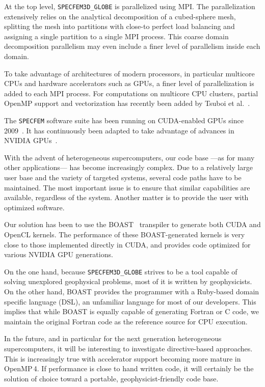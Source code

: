 At the top level, \texttt{SPECFEM3D\_GLOBE} is parallelized using MPI. The
parallelization extensively relies on the analytical decomposition of a
cubed-sphere mesh, splitting the mesh into partitions with close-to perfect load
balancing and assigning a single partition to a single MPI process. This coarse
domain decomposition parallelism may even include a finer level of parallelism
inside each domain.

To take advantage of architectures of modern processors, in particular multicore
CPUs and hardware accelerators such as GPUs, a finer level of parallelization is
added to each MPI process. For computations on multicore CPU clusters, partial
OpenMP support and vectorization has recently been added by Tsuboi et
al.~\cite{Tsuboi28022016}.

The \texttt{SPECFEM} software suite has been running on CUDA-enabled
GPUs since 2009~\cite{KoMiEr09}. It has continuously been adapted to take
advantage of advances in NVIDIA
GPUs~\cite{Komatitsch20107692, Rietmann2012}.

With the advent of heterogeneous supercomputers, our code base ---as for many
other applications--- has become increasingly complex. Due to a relatively large
user base and the variety of targeted systems, several code paths have to be
maintained. The most important issue is to ensure that similar capabilities are
available, regardless of the system. Another matter is to provide the user with
optimized software.

Our solution has been to use the BOAST~\cite{Cronsioe2013} transpiler to
generate both CUDA and OpenCL kernels. The performance of these BOAST-generated
kernels is very close to those implemented directly in CUDA, and provides code
optimized for various NVIDIA GPU generations.

On the one hand, because \texttt{SPECFEM3D\_GLOBE} strives to be a tool capable of solving
unexplored geophysical problems, most of it is written by geophysicists. On the
other hand, BOAST provides the programmer with a Ruby-based domain specific
language (DSL), an unfamiliar language for most of our developers. This implies
that while BOAST is equally capable of generating Fortran or C code, we maintain
the original Fortran code as the reference source for CPU execution.

In the future, and in particular for the next generation heterogeneous
supercomputers, it will be interesting to investigate
directive-based approaches. This is increasingly true with accelerator support
becoming more mature in OpenMP\,4. If performance is close to hand written code,
it will certainly be the solution of choice toward a portable, geophysicist-friendly code base.



